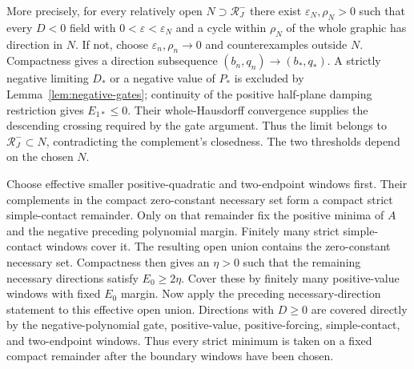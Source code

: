 More precisely, for every relatively open
$N\supset\mathcal R_J^-$ there exist $\varepsilon_N,\rho_N>0$
such that every $D<0$ field with
$0<\varepsilon<\varepsilon_N$ and a cycle within
$\rho_N$ of the whole graphic has direction in $N$.
If not, choose $\varepsilon_n,\rho_n\to0$ and counterexamples
outside $N$. Compactness gives a direction subsequence
$(b_n,q_n)\to(b_*,q_*)$. A strictly negative limiting $D_*$ or
a negative value of $P_*$ is excluded by
Lemma~\ref{lem:negative-gates}; continuity of the positive
half-plane damping restriction gives $E_{1*}\le0$.
Their whole-Hausdorff convergence supplies the descending crossing
required by the gate argument.
Thus the limit belongs to $\mathcal R_J^-\subset N$,
contradicting the complement's closedness.
The two thresholds depend on the chosen $N$.

Choose effective smaller positive-quadratic and two-endpoint
windows first. Their complements in the compact zero-constant
necessary set form a compact strict simple-contact remainder.
Only on that remainder fix the positive minima of $A$ and
the negative preceding polynomial margin.
Finitely many strict simple-contact windows cover it.
The resulting open union contains the zero-constant necessary
set. Compactness then gives an $\eta>0$ such that the
remaining necessary directions satisfy $E_0\ge2\eta$.
Cover these by finitely many positive-value windows with fixed
$E_0$ margin. Now apply the preceding necessary-direction
statement to this effective open union.
Directions with $D\ge0$ are covered directly by the
negative-polynomial gate, positive-value, positive-forcing,
simple-contact, and two-endpoint windows.
Thus every strict minimum is taken on a fixed compact remainder
after the boundary windows have been chosen.

